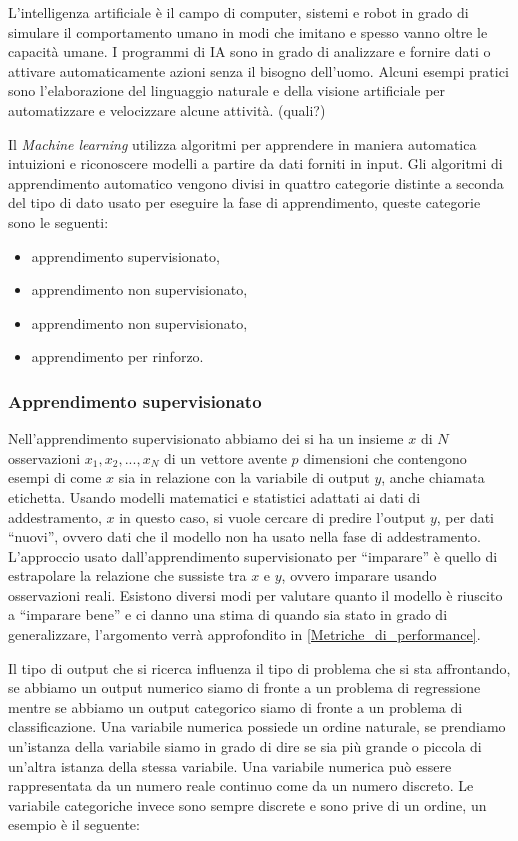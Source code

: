 \documentclass[12pt,italian]{report}
\begin{document}
	L'intelligenza artificiale è il campo di computer, sistemi e robot in grado di simulare il comportamento umano in modi che imitano e spesso vanno oltre le capacità umane. I programmi di IA sono in grado di analizzare e fornire dati o attivare automaticamente azioni senza il bisogno dell'uomo. Alcuni esempi pratici sono l'elaborazione del linguaggio naturale e della visione artificiale per automatizzare e velocizzare alcune attività. (quali?)
	
	Il \textit{Machine learning} utilizza algoritmi per apprendere in maniera automatica intuizioni e riconoscere modelli a partire da dati forniti in input. Gli algoritmi di apprendimento automatico vengono divisi in quattro categorie distinte a seconda del tipo di dato usato per eseguire la fase di apprendimento, queste categorie sono le seguenti:
	\begin{itemize}
		\item apprendimento supervisionato,
		\item apprendimento non supervisionato,
		\item apprendimento non supervisionato,
		\item apprendimento per rinforzo.
	\end{itemize}
	
	\subsubsection{Apprendimento supervisionato}
	Nell'apprendimento supervisionato abbiamo dei si ha un insieme $x$ di $N$ osservazioni $x_1, x_2,...,x_N$ di un vettore avente $p$ dimensioni che contengono esempi di come $x$ sia in relazione con la variabile di output $y$, anche chiamata etichetta. Usando modelli matematici e statistici adattati ai dati di addestramento, $x$ in questo caso, si vuole cercare di predire l'output $y$, per dati ``nuovi'', ovvero dati che il modello non ha usato nella fase di addestramento.
	L'approccio usato dall'apprendimento supervisionato per ``imparare'' è quello di estrapolare la relazione che sussiste tra $x$ e $y$, ovvero imparare usando osservazioni reali.
	Esistono diversi modi per valutare quanto il modello è riuscito a ``imparare bene'' e ci danno una stima di quando sia stato in grado di generalizzare, l'argomento verrà approfondito in \ref{Metriche_di_performance}.
	
	Il tipo di output che si ricerca influenza il tipo di problema che si sta affrontando, se abbiamo un output numerico siamo di fronte a un problema di regressione mentre se abbiamo un output categorico siamo di fronte a un problema di classificazione.
	Una variabile numerica possiede un ordine naturale, se prendiamo un'istanza della variabile siamo in grado di dire se sia più grande o piccola di un'altra istanza della stessa variabile. Una variabile numerica può essere rappresentata da un numero reale continuo come da un numero discreto.
	Le variabile categoriche invece sono sempre discrete e sono prive di un ordine, un esempio è il seguente:
	
\end{document}

